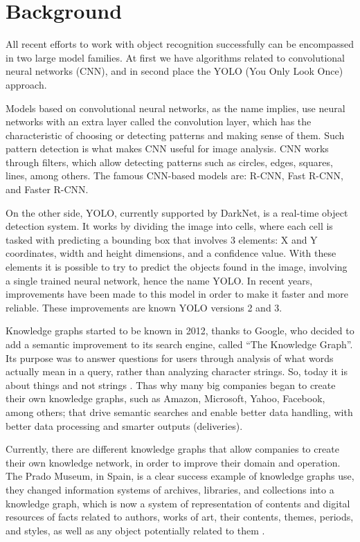 \section{Background}

All recent efforts to work with object recognition successfully can be 
encompassed in two large model families. At first we have algorithms 
related to convolutional neural networks (CNN), and  in second place  the YOLO 
(You Only Look Once) approach.

Models based on convolutional neural networks, as the name implies, use neural 
networks with an extra layer called the convolution layer, which has the 
characteristic of choosing or detecting patterns and making sense of them. 
Such pattern detection is what makes CNN useful for image analysis. CNN works 
through filters, which allow detecting patterns such as circles, edges, squares, 
lines, among others. The famous CNN-based models are: R-CNN, Fast R-CNN, and 
Faster R-CNN.

On the other side, YOLO, currently supported by DarkNet, is a real-time object 
detection system. It works by dividing the image into cells, where each cell is 
tasked with predicting a bounding box that involves 3 elements: X and Y 
coordinates, width and height dimensions, and a confidence value. With these 
elements it is possible to try to predict the objects found in the image, 
involving a single trained neural network, hence the name YOLO. In recent years, 
improvements have been made to this model in order to make it faster and more 
reliable. These improvements are known YOLO versions 2 and 3.

Knowledge graphs started to be known in 2012, thanks to 
Google, who decided to add a semantic improvement to its search 
engine, called “The Knowledge Graph”. Its purpose was to answer 
questions for users through analysis of what words actually mean in a query, 
rather than analyzing character strings. So, today it is about things and not 
strings \cite{Barnard}. Thas why many big companies began to create their own 
knowledge graphs, such as Amazon, Microsoft, Yahoo, Facebook, among others; 
that drive semantic searches and enable better data handling, with better 
data processing and smarter outputs (deliveries).

Currently, there are different knowledge graphs that allow companies to 
create their own knowledge network, in order to improve their domain and 
operation. The Prado Museum, in Spain, is a clear success example of knowledge 
graphs use, they changed information systems of archives, libraries, 
and collections into a knowledge graph, which is now  
a system of representation of contents and digital resources of facts related 
to authors, works of art, their contents, themes, periods, and styles, as 
well as any object potentially related to them \cite{Museo del Prado}.

